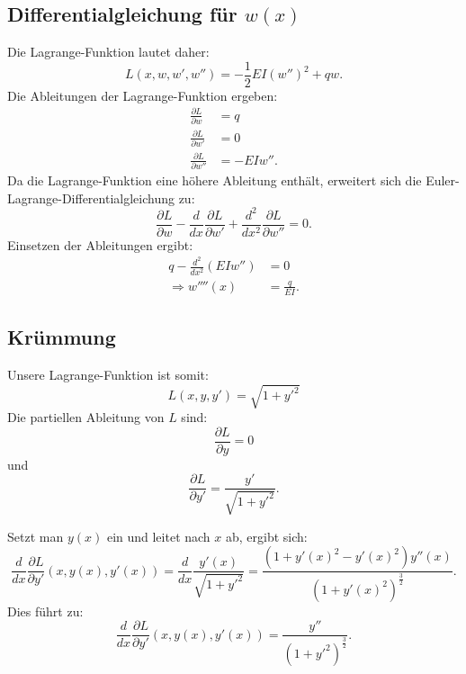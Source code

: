 \subsection{Differentialgleichung für $w(x)$}
Die Lagrange-Funktion lautet daher:
\begin{equation}
	L(x,w,w',w'') = -\frac{1}{2} E I (w'')^2 + q w.
\end{equation}
Die Ableitungen der Lagrange-Funktion ergeben:
\begin{align}
	\frac{\partial L}{\partial w} &= q \\
	\frac{\partial L}{\partial w'} &= 0 \\
	\frac{\partial L}{\partial w''} &= -E I w''.
\end{align}
Da die Lagrange-Funktion eine höhere Ableitung enthält, erweitert sich die Euler-Lagrange-Differentialgleichung zu:
\begin{equation}
	\frac{\partial L}{\partial w} - \frac{d}{dx} \frac{\partial L}{\partial w'} + \frac{d^2}{dx^2} \frac{\partial L}{\partial w''} = 0.
\end{equation}
Einsetzen der Ableitungen ergibt:
	\begin{align}
		q - \frac{d^2}{dx^2}(E I w'') &= 0 \\
		\Rightarrow w''''(x) &= \frac{q}{E I}.
	\end{align}

\subsection{Krümmung}
Unsere Lagrange-Funktion ist somit:
\begin{equation}
	L(x,y,y') = \sqrt{1 + {y'}^2}
\end{equation}
Die partiellen Ableitung von $L$ sind:
\begin{equation}
	\frac{\partial L}{\partial y} = 0
\end{equation}
und
\begin{equation}
	\frac{\partial L}{\partial y'} = \frac{y'}{\sqrt{1 + {y'}^2}}.
\end{equation}

Setzt man $y(x)$ ein und leitet nach $x$ ab, ergibt sich:
\begin{equation}
	\frac{d}{dx} \frac{\partial L}{\partial y'}(x,y(x),y'(x)) = \frac{d}{dx} \frac{y'(x)}{\sqrt{1 + {y'}^2}} = \frac{(1 + {y'(x)}^2 - {y'(x)}^2) y''(x)}{(1 + {y'(x)}^2)^{\frac{3}{2}}}.
\end{equation}
Dies führt zu:
\begin{equation}
	\frac{d}{dx} \frac{\partial L}{\partial y'}(x,y(x),y'(x)) = \frac{y''}{(1 + {y'}^2)^{\frac{3}{2}}}.
\end{equation}

